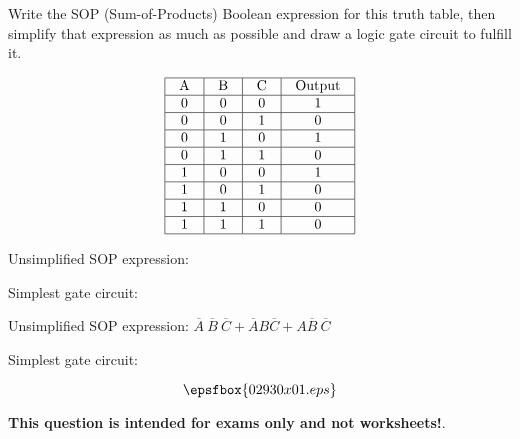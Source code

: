 

Write the SOP (Sum-of-Products) Boolean expression for this truth table, then simplify that expression as much as possible and draw a logic gate circuit to fulfill it.


$$\vbox{\offinterlineskip
\halign{\strut
\vrule \quad\hfil # \ \hfil & 
\vrule \quad\hfil # \ \hfil & 
\vrule \quad\hfil # \ \hfil & 
\vrule \quad\hfil # \ \hfil \vrule \cr
\noalign{\hrule}
%
A & B & C & Output \cr
%
\noalign{\hrule}
%
0 & 0 & 0 & 1 \cr
%
\noalign{\hrule}
%
0 & 0 & 1 & 0 \cr
%
\noalign{\hrule}
%
0 & 1 & 0 & 1 \cr
%
\noalign{\hrule}
%
0 & 1 & 1 & 0 \cr
%
\noalign{\hrule}
%
1 & 0 & 0 & 1 \cr
%
\noalign{\hrule}
%
1 & 0 & 1 & 0 \cr
%
\noalign{\hrule}
%
1 & 1 & 0 & 0 \cr
%
\noalign{\hrule}
%
1 & 1 & 1 & 0 \cr
%
\noalign{\hrule}
} %
}$$ %

Unsimplified SOP expression:

\vskip 10pt

Simplest gate circuit:







Unsimplified SOP expression: $\overline{A} \> \overline{B} \> \overline{C} + \overline{A}B\overline{C} + A \overline{B} \> \overline{C}$

\vskip 10pt

Simplest gate circuit:

$$\epsfbox{02930x01.eps}$$







{\bf This question is intended for exams only and not worksheets!}.




